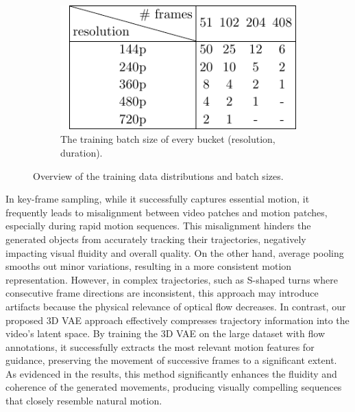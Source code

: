 \begin{figure}[!ht]
    \begin{subfigure}[c]{0.3\textwidth}
        \centering
        \includegraphics[width=\linewidth]{images/bucket.pdf}
        \caption{The training batch size of every bucket (resolution, duration).}
        \label{sup.f.bucket}   
    \end{subfigure}
    
    \caption{Overview of the training data distributions and batch sizes.}
    \label{fig:combined}
\end{figure}

In key-frame sampling, while it successfully captures essential motion, it frequently leads to misalignment between video patches and motion patches, especially during rapid motion sequences. This misalignment hinders the generated objects from accurately tracking their trajectories, negatively impacting visual fluidity and overall quality. On the other hand, average pooling smooths out minor variations, resulting in a more consistent motion representation. However, in complex trajectories, such as S-shaped turns where consecutive frame directions are inconsistent, this approach may introduce artifacts because the physical relevance of optical flow decreases. In contrast, our proposed 3D VAE approach effectively compresses trajectory information into the video's latent space. By training the 3D VAE on the large dataset with flow annotations, it successfully extracts the most relevant motion features for guidance, preserving the movement of successive frames to a significant extent. As evidenced in the results, this method significantly enhances the fluidity and coherence of the generated movements, producing visually compelling sequences that closely resemble natural motion.

